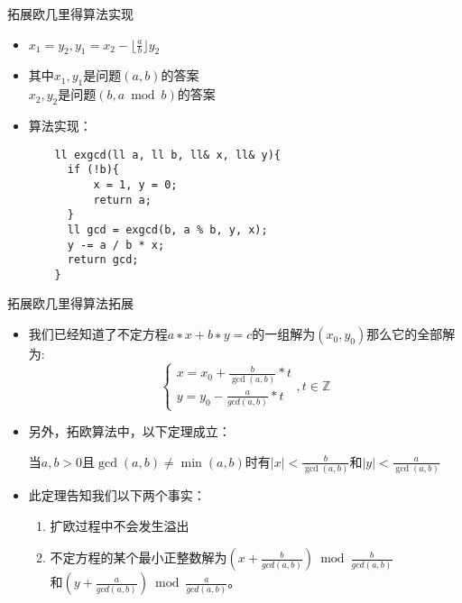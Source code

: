 \begin{frame}[fragile]{拓展欧几里得算法}{实现}
  \begin{itemize}
    \item $x_1=y_2,y_1=x_2-\lfloor\frac{a}{b}\rfloor y_2$
    \item 其中$x_1,y_1$是问题$(a,b)$的答案\\
    $x_2,y_2$是问题$(b,a\bmod b)$的答案
    \pause 
    \item 算法实现：
    \begin{lstlisting}
    ll exgcd(ll a, ll b, ll& x, ll& y){
      if (!b){
          x = 1, y = 0;
          return a;
      }
      ll gcd = exgcd(b, a % b, y, x);
      y -= a / b * x;    
      return gcd;
    }
    \end{lstlisting}
  \end{itemize}
\end{frame}

\begin{frame}[fragile]{拓展欧几里得算法}{拓展}
  \begin{itemize}
    \item 我们已经知道了不定方程$a∗x+b∗y=c$的一组解为$(x_0,y_0)$那么它的全部解为:
      $$
      \left\{\begin{array}{l}
      x=x_{0}+\frac{b}{\operatorname{gcd}(a, b)} * t \\
      y=y_{0}-\frac{a}{g c d(a, b)} * t
      \end{array}, t \in \mathbb{Z}\right.
      $$
    \pause
    \item 另外，拓欧算法中，以下定理成立：
    \begin{theorem}
      当$a,b>0$且$\gcd(a,b)\neq\min(a,b)$时有$|x|<\frac{b}{\gcd(a,b)}$和$|y|<\frac{a}{\gcd(a,b)}$
    \end{theorem}
    \pause
    \item 此定理告知我们以下两个事实：
    \begin{enumerate}
      \item 扩欧过程中不会发生溢出
      \item 不定方程的某个最小正整数解为$\left(x+\frac{b}{g c d(a, b)}\right) \bmod \frac{b}{g c d(a, b)}$\\
      和$\left(y+\frac{a}{g c d(a, b)}\right) \bmod{\frac{a}{g c d(a, b)}}$。
    \end{enumerate}
  \end{itemize}
\end{frame}


